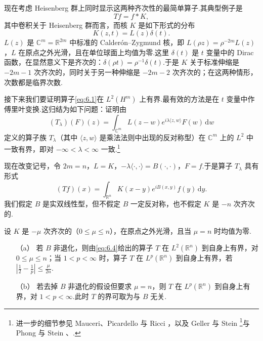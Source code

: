 \documentclass[
  BookTitleCN={傅里叶分析中的振动积分},
  BookTitleEN={Oscillatory Integrals in Fourier Analysis},
  OriginalAuthor={E.~M. Stein},
  OriginalEdition={Proc. Sympos. Pure Math. 35, Part~1},
  OriginalPublisher={American Mathematical Society},
  OriginalYear={1979},
  Translator={翻译及重排},
  ModelUsed={Codex CLI},
  Biblatex=false,
  TranslationDate={2026年8月27日}
]{mathtranslation}
\numberwithin{equation}{chapter}   %
\newcommand{\R}{\mathbb{R}}
\newcommand{\C}{\mathbb{C}}
\begin{document}
现在考虑 Heisenberg 群上同时显示这两种齐次性的最简单算子.其典型例子是
\begin{equation}
  Tf = f*K, \label{eq:6.1}
\end{equation}
其中卷积关于 Heisenberg 群而言，而核 $K$ 是如下形式的分布
\begin{equation}
  K(z,t) = L(z)\delta(t). \label{eq:6.2}
\end{equation}
$L(z)$ 是 $\C^{m}=\R^{2m}$ 中标准的 Calder\'on--Zygmund 核，即 $L(\rho z)=\rho^{-2m}L(z)$，$L$ 在原点之外光滑，且在单位球面上均值为零.这里 $\delta(t)$ 是 $t$ 变量中的 Dirac 函数，在显然意义下是齐次的：$\delta(\rho t)=\rho^{-1}\delta(t)$.于是 $K$ 关于标准伸缩是 $-2m-1$ 次齐次的，同时关于另一种伸缩是 $-2m-2$ 次齐次的；在这两种情形，次数都是临界次数.

接下来我们要证明算子\eqref{eq:6.1}在 $L^{2}(H^{m})$ 上有界.最有效的方法是在 $t$ 变量中作傅里叶变换.这归结为如下问题：证明由
\begin{equation}
  (T_{\lambda})(F)(z)=\int_{\C^{m}}L(z-w)e^{i\lambda\langle z,w\rangle}F(w)\,\mathrm{d}w \label{eq:6.3}
\end{equation}
定义的算子族 $T_{\lambda}$（其中 $\langle z,w\rangle$ 是乘法法则中出现的反对称型）在 $\C^{m}$ 上的 $L^{2}$ 中一致有界，即对 $-\infty<\lambda<\infty$ 一致.\footnote{进一步的细节参见 Mauceri、Picardello 与 Ricci \cite{ref19}，以及 Geller 与 Stein \cite{ref11}\footnote{原书此处误引为 [10]，实际指参考文献 \cite{ref11}（Geller 与 Stein 关于 Heisenberg 群上算子的论文）.}与 Phong 与 Stein \cite{ref22}、\cite{ref23}.}

现在改变记号，令 $2m=n$，$L=K$，$-\lambda\langle\cdot,\cdot\rangle=B(\cdot,\cdot)$，$F=f$.于是算子 $T_{\lambda}$ 具有形式
\begin{equation}
  (Tf)(x)=\int_{\R^{n}}K(x-y)e^{iB(x,y)}f(y)\,\mathrm{d}y. \label{eq:6.4}
\end{equation}
我们假定 $B$ 是实双线性型，但不假定 $B$ 一定反对称，也不假定 $K$ 是 $-n$ 次齐次的.

\begin{theorem}\label{thm:7}
  设 $K$ 是 $-\mu$ 次齐次的（$0\leq\mu\leq n$），在原点之外光滑，且当 $\mu=n$ 时均值为零.
  \begin{enumerate}
    \item[（a）] 若 $B$ 非退化，则由\eqref{eq:6.4}给出的算子 $T$ 在 $L^{2}(\R^{n})$ 到自身上有界，对 $0\leq\mu\leq n$；当 $1<p<\infty$ 时，算子 $T$ 在 $L^{p}(\R^{n})$ 到自身上有界，若 $\left|\frac{1}{2}-\frac{1}{p}\right|\leq\frac{\mu}{2n}$.
    \item[（b）] 若去掉 $B$ 非退化的假设但要求 $\mu=n$，则 $T$ 在 $L^{p}(\R^{n})$ 到自身上有界，对 $1<p<\infty$.此时 $T$ 的界可取为与 $B$ 无关.
  \end{enumerate}
\end{theorem}
\end{document}
